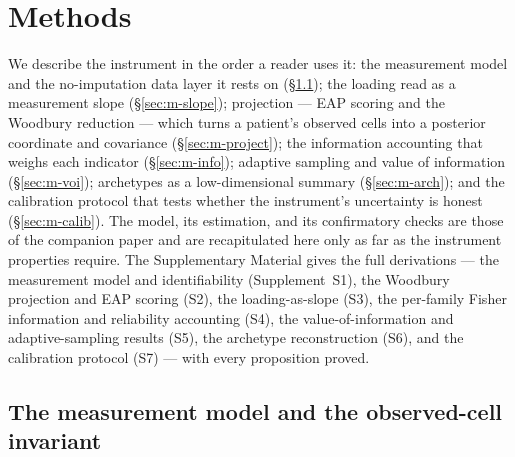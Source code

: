 \section{Methods}

We describe the instrument in the order a reader uses it: the measurement model
and the no-imputation data layer it rests on (\S\ref{sec:m-model}); the loading
read as a measurement slope (\S\ref{sec:m-slope}); projection --- EAP scoring and
the Woodbury reduction --- which turns a patient's observed cells into a posterior
coordinate and covariance (\S\ref{sec:m-project}); the information accounting that
weighs each indicator (\S\ref{sec:m-info}); adaptive sampling and value of
information (\S\ref{sec:m-voi}); archetypes as a low-dimensional summary
(\S\ref{sec:m-arch}); and the calibration protocol that tests whether the
instrument's uncertainty is honest (\S\ref{sec:m-calib}). The model, its
estimation, and its confirmatory checks are those of the companion paper and are
recapitulated here only as far as the instrument properties require. The
Supplementary Material gives the full derivations --- the measurement model and
identifiability (Supplement~S1), the Woodbury projection and EAP scoring (S2), the
loading-as-slope (S3), the per-family Fisher information and reliability accounting
(S4), the value-of-information and adaptive-sampling results (S5), the archetype
reconstruction (S6), and the calibration protocol (S7) --- with every proposition
proved.

\subsection{The measurement model and the observed-cell invariant}
\label{sec:m-model}

